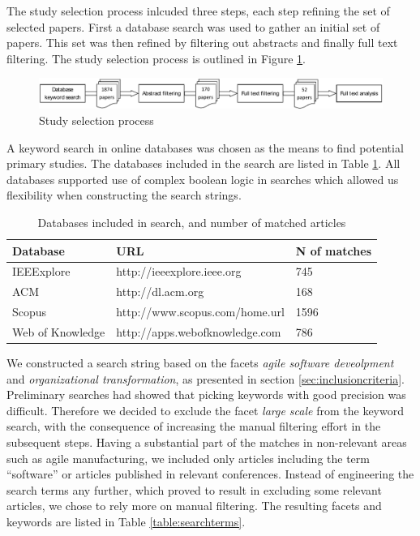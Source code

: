 \documentclass[preprint,authoryear,12pt]{elsarticle}
\begin{document}
The study selection process inlcuded three steps, each step refining the set of
selected papers. First a database search was used to gather an initial set of
papers. This set was then refined by filtering out abstracts and finally full
text filtering. The study selection process is outlined in Figure
\ref{fig:selectionprocess}.

\begin{figure}[b]
  \begin{center}
    \includegraphics[width=1\textwidth]{graphics/research_process.pdf}
    \caption{Study selection process}
    \label{fig:selectionprocess}
  \end{center}
\end{figure}

A keyword search in online databases was chosen as the means to find potential
primary studies. The databases included in the search are listed in Table
\ref{table:databases}. All databases supported use of complex boolean logic in
searches which allowed us flexibility when constructing the search strings.

\begin{table}
    \begin{tabular}{ p{} l l }
        \toprule
        Database         & URL                         & N of matches   \\
        \midrule
        IEEExplore       & http://ieeexplore.ieee.org      & 745 \\ 
        ACM              & http://dl.acm.org               & 168 \\
        Scopus           & http://www.scopus.com/home.url  & 1596 \\
        Web of Knowledge & http://apps.webofknowledge.com  & 786 \\
        \bottomrule
    \end{tabular}
    \caption{Databases included in search, and number of matched articles}
    \label{table:databases}
\end{table}

We constructed a search string based on the facets \emph{agile software
deveolpment} and \emph{organizational transformation}, as presented in section
\ref{sec:inclusioncriteria}. Preliminary searches had showed that picking
keywords with good precision was difficult. Therefore we decided to exclude the
facet \emph{large scale} from the keyword search, with the consequence of
increasing the manual filtering effort in the subsequent steps.
Having a substantial part of the matches in non-relevant areas such as agile
manufacturing, we included only articles including the term ``software'' or
articles published in relevant conferences. Instead of engineering the search
terms any further, which proved to result in excluding some relevant articles,
we chose to rely more on manual filtering. The resulting facets and keywords are
listed in Table \ref{table:searchterms}.
\end{document}
